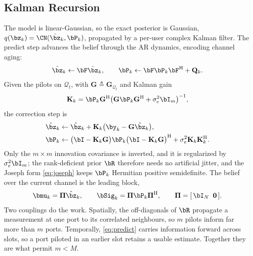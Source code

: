 \subsection{Kalman Recursion}
The model is linear-Gaussian, so the exact posterior is Gaussian,
$q(\bz_k)=\CN(\hat{\bz}_k,\bP_k)$, propagated by a per-user complex Kalman
filter. The predict step advances the belief through the AR dynamics, encoding
channel aging:
\begin{equation}
  \hat{\bz}_k \leftarrow \bF\hat{\bz}_k,
  \qquad
  \bP_k \leftarrow \bF\bP_k\bF^{\mathrm{H}} + \mathbf{Q}_k .
  \label{eq:predict}
\end{equation}
Given the pilots on $\mathcal{Q}_t$, with
$\mathbf{G}\triangleq\mathbf{G}_{\mathcal{Q}_t}$ and Kalman gain
\begin{equation}
  \mathbf{K}_k = \bP_k\mathbf{G}^{\mathrm{H}}
  \big(\mathbf{G}\bP_k\mathbf{G}^{\mathrm{H}}+\sigma_e^2\bI_m\big)^{-1},
  \label{eq:gain}
\end{equation}
the correction step is
\begin{align}
  \hat{\bz}_k &\leftarrow \hat{\bz}_k
     + \mathbf{K}_k\big(\by_k-\mathbf{G}\hat{\bz}_k\big),
  \label{eq:mean}\\
  \bP_k &\leftarrow
     \big(\bI-\mathbf{K}_k\mathbf{G}\big)\bP_k
     \big(\bI-\mathbf{K}_k\mathbf{G}\big)^{\mathrm{H}}
     + \sigma_e^2\mathbf{K}_k\mathbf{K}_k^{\mathrm{H}} .
  \label{eq:joseph}
\end{align}
Only the $m\times m$ innovation covariance is inverted, and it is regularized
by $\sigma_e^2\bI_m$; the rank-deficient prior $\bR$ therefore needs no
artificial jitter, and the Joseph form \eqref{eq:joseph} keeps $\bP_k$
Hermitian positive semidefinite. The belief over the current channel is the
leading block,
\begin{equation}
  \bmu_k = \boldsymbol{\Pi}\hat{\bz}_k,
  \qquad
  \bSig_k = \boldsymbol{\Pi}\bP_k\boldsymbol{\Pi}^{\mathrm{H}},
  \qquad
  \boldsymbol{\Pi} = [\,\bI_N\;\;\mathbf{0}\,].
  \label{eq:marginal}
\end{equation}
Two couplings do the work. Spatially, the off-diagonals of $\bR$ propagate a
measurement at one port to its correlated neighbours, so $m$ pilots inform far
more than $m$ ports. Temporally, \eqref{eq:predict} carries information forward
across slots, so a port piloted in an earlier slot retains a usable estimate.
Together they are what permit $m<M$.

